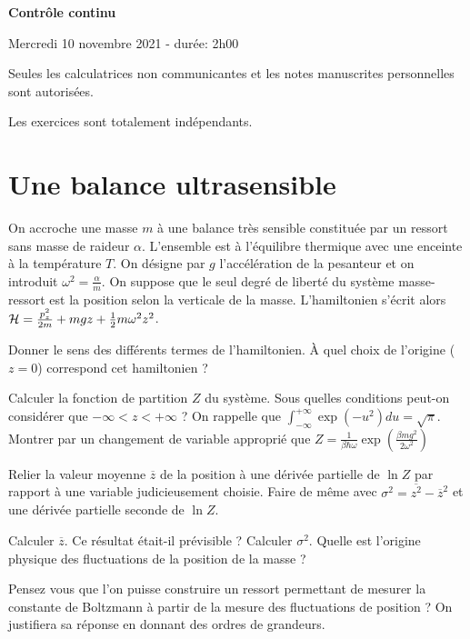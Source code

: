 \documentclass[utf8, 11pt]{feuille}
\begin{document}
\begin{center}
    \Large {\bf Contrôle continu}
    
    Mercredi 10 novembre 2021 - durée: 2h00
\end{center}

Seules les calculatrices non communicantes et les notes manuscrites personnelles sont autorisées.

Les exercices sont totalement indépendants.

%





\section{Une balance ultrasensible}

On accroche une masse $m$ à une balance très sensible constituée par un ressort sans masse de raideur $\alpha$. L'ensemble est à l'équilibre thermique avec une enceinte à la température $T$. On désigne par $g$ l'accélération de la pesanteur et on introduit $\omega^2=\frac{\alpha}{m}$. On suppose que le seul degré de liberté du système masse-ressort est la position selon la verticale de la masse. L'hamiltonien  s'écrit alors ${\cal H}=\frac{p_z^2}{2m}+mgz+\frac{1}{2} m\omega^2 z^2$.

\medskip

\question Donner le sens des différents termes de l'hamiltonien. \`A quel choix de l'origine ($z=0$) correspond cet hamiltonien ? 

\question Calculer la fonction de partition $Z$ du système. Sous quelles conditions peut-on considérer que $-\infty < z < +\infty$ ? On rappelle que $\int_{-\infty}^{+\infty} \exp(-u^2) du= \sqrt{\pi}$. Montrer par un changement de variable approprié que $Z=\frac{1}{\beta \hbar \omega} \exp(\frac{\beta m g ^2}{2 \omega^2})$

\question Relier la valeur moyenne $\overline z$ de la position à une dérivée partielle de $\ln Z$ par rapport à une variable judicieusement choisie. Faire de même avec $\sigma^2=\overline{z^2} - \overline{z}^2$   et une dérivée partielle seconde de  $\ln Z$.

\question Calculer $\overline z$. Ce résultat était-il prévisible ? Calculer $\sigma^2$. Quelle est l'origine physique des fluctuations de la position de la masse ?

\question Pensez vous que l'on puisse construire un ressort permettant de mesurer la constante de Boltzmann à partir de la mesure des fluctuations de position ? On justifiera sa réponse en donnant des ordres de grandeurs.
\end{document}
